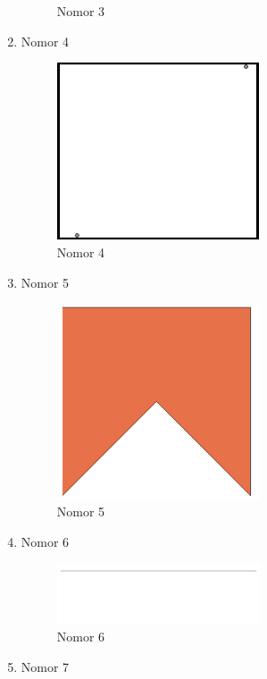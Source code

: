 \begin{enumerate}
\begin{figure}[H]
		\centering
		\caption{Nomor 3}
	\end{figure}
    \item Nomor 4
    
    \begin{figure}[H]
		\includegraphics[width=6cm]{figures/1174035/tugas2/soal_4.png}
		\centering
		\caption{Nomor 4}
	\end{figure}
    \item Nomor 5
    
    \begin{figure}[H]
		\includegraphics[width=6cm]{figures/1174035/tugas2/soal_5.png}
		\centering
		\caption{Nomor 5}
	\end{figure}
    \item Nomor 6
    
    \begin{figure}[H]
		\includegraphics[width=6cm]{figures/1174035/tugas2/soal_6.png}
		\centering
		\caption{Nomor 6}
	\end{figure}
    \item Nomor 7
    
    \begin{figure}[H]

\end{figure}
\end{enumerate}
